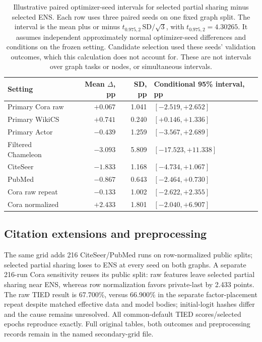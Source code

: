 \begin{table}[t]
\centering\small
\caption{Illustrative paired optimizer-seed intervals for selected partial sharing minus selected ENS. Each row uses three paired seeds on one fixed graph split. The interval is the mean plus or minus $t_{0.975,2}\,\mathrm{SD}/\sqrt{3}$, with $t_{0.975,2}=4.30265$. It assumes independent approximately normal optimizer-seed differences and conditions on the frozen setting. Candidate selection used these seeds' validation outcomes, which this calculation does not account for. These are not intervals over graph tasks or nodes, or simultaneous intervals.}
\label{tab:conditional-seed-intervals}
\setlength{\tabcolsep}{4pt}
\begin{tabular}{lrrl}
\toprule
Setting & Mean $\Delta$, pp & SD, pp & Conditional 95\% interval, pp\\
\midrule
Primary Cora raw & $+0.067$ & 1.041 & $[-2.519,+2.652]$\\
Primary WikiCS & $+0.741$ & 0.240 & $[+0.146,+1.336]$\\
Primary Actor & $-0.439$ & 1.259 & $[-3.567,+2.689]$\\
Filtered Chameleon & $-3.093$ & 5.809 & $[-17.523,+11.338]$\\
CiteSeer & $-1.833$ & 1.168 & $[-4.734,+1.067]$\\
PubMed & $-0.867$ & 0.643 & $[-2.464,+0.730]$\\
Cora raw repeat & $-0.133$ & 1.002 & $[-2.622,+2.355]$\\
Cora normalized & $+2.433$ & 1.801 & $[-2.040,+6.907]$\\
\bottomrule
\end{tabular}
\end{table}

\subsection{Citation extensions and preprocessing}\label{app:planetoid-confirmation}\label{app:cora-preprocessing}
The same grid adds 216 CiteSeer/PubMed runs on row-normalized public splits; selected partial sharing loses to ENS at every seed on both graphs. A separate 216-run Cora sensitivity reuses its public split: raw features leave selected partial sharing near ENS, whereas row normalization favors private-last by 2.433 points. The raw TIED result is 67.700\%, versus 66.900\% in the separate factor-placement repeat despite matched effective data and model bodies; initial-logit hashes differ and the cause remains unresolved. All common-default TIED scores/selected epochs reproduce exactly. Full original tables, both outcomes and preprocessing records remain in the named secondary-grid file.

